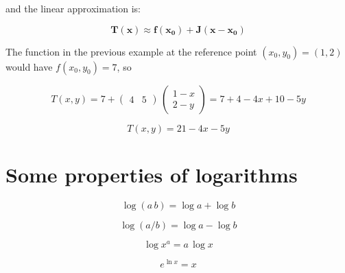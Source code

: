 \documentclass{tufte-book} %
\begin{document}
and the linear approximation is:

\begin{equation}
	\label{TaylorLin_nvar}
	\mathbf{T(x)} \approx  \mathbf{f(x_0)} + \mathbf{J} \left( \mathbf{x} - \mathbf{x_0}\right)
\end{equation}

The function in the previous example at the reference point $(x_0, y_0)=(1,2)$ would have $f(x_0, y_0)=7$, so


\begin{equation}
	T(x,y) = 7 + \begin{pmatrix} 4 & 5 \end{pmatrix} \, \begin{pmatrix} 1-x \\ 2-y \end{pmatrix} = 7 +  4- 4 x + 10-5 y  \nonumber
\end{equation}

\begin{equation}
	T(x,y) = 21 - 4 x - 5 y  \nonumber
\end{equation}

\FloatBarrier

\section{Some properties of logarithms}
\label{logprop}
\begin{equation}
 \log{(a \, b)} =	\log{a} + \log{b} 
\end{equation}

\begin{equation}
	\log{(a / b)} =	\log{a} - \log{b} 
\end{equation}

\begin{equation}
	\log{x^a} =a \, \log{x} 
\end{equation}

\begin{equation}
	e^{\ln{x}} = x 
\end{equation}
\end{document}
